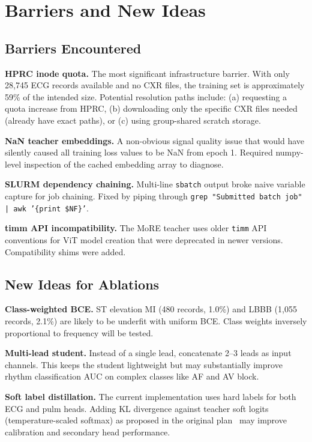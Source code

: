 \documentclass[sigconf,nonacm]{acmart}
\begin{document}
\section{Barriers and New Ideas}

\subsection{Barriers Encountered}

\textbf{HPRC inode quota.} The most significant infrastructure barrier.
With only 28,745 ECG records available and no CXR files, the training
set is approximately 59\% of the intended size. Potential resolution
paths include: (a) requesting a quota increase from HPRC, (b) downloading
only the specific CXR files needed (already have exact paths), or
(c) using group-shared scratch storage.

\textbf{NaN teacher embeddings.} A non-obvious signal quality issue
that would have silently caused all training loss values to be NaN from
epoch 1. Required numpy-level inspection of the cached embedding array
to diagnose.

\textbf{SLURM dependency chaining.} Multi-line \texttt{sbatch} output
broke naive variable capture for job chaining. Fixed by piping through
\texttt{grep "Submitted batch job" | awk '\{print \$NF\}'}.

\textbf{timm API incompatibility.} The MoRE teacher uses older
\texttt{timm} API conventions for ViT model creation that were
deprecated in newer versions. Compatibility shims were added.

\subsection{New Ideas for Ablations}

\textbf{Class-weighted BCE.} ST elevation MI (480 records, 1.0\%) and
LBBB (1,055 records, 2.1\%) are likely to be underfit with uniform BCE.
Class weights inversely proportional to frequency will be tested.

\textbf{Multi-lead student.} Instead of a single lead, concatenate
2–3 leads as input channels. This keeps the student lightweight but
may substantially improve rhythm classification AUC on complex classes
like AF and AV block.

\textbf{Soft label distillation.}
The current implementation uses hard labels for both ECG and pulm heads.
Adding KL divergence against teacher soft logits (temperature-scaled
softmax) as proposed in the original plan~\cite{hinton2015distilling}
may improve calibration and secondary head performance.
\end{document}

